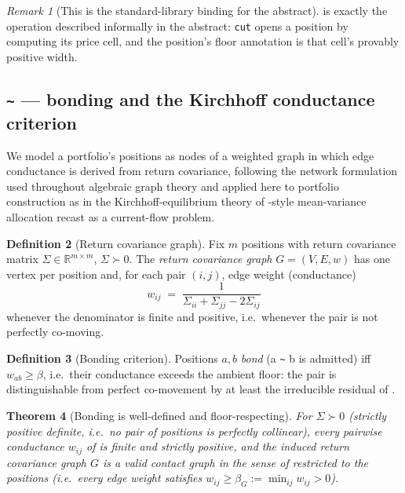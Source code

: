 \documentclass[11pt,a4paper]{article}
\theoremstyle{thmstyle}
\newtheorem{theorem}{Theorem}[section]
\theoremstyle{definition}
\newtheorem{definition}[theorem]{Definition}
\theoremstyle{remark}
\newtheorem{remark}[theorem]{Remark}
\newcommand{\R}{\mathbb{R}}
\newcommand{\V}{V}
\newcommand{\E}{E}
\newcommand{\wt}{w}
\newcommand{\flo}{\beta}
\newcommand{\sh}[1]{\texttt{#1}}
\begin{document}
\begin{remark}[This is the standard-library binding for the abstract]
\label{rem:bind-position}
 is exactly the operation described informally in
the abstract: \sh{cut} opens a position by computing its price cell, and
the position's floor annotation is that cell's provably positive width.
\end{remark}

\subsection{\texorpdfstring{\sh{\~{}} --- bonding and the Kirchhoff conductance criterion}{~ --- bonding}}
\label{sec:stdlib-bond}

We model a portfolio's positions as nodes of a weighted graph in which
edge conductance is derived from return covariance, following the
network formulation used throughout algebraic graph theory
\citep{godsilroyle2001,fiedler1973} and applied here to portfolio
construction as in the Kirchhoff-equilibrium theory of
\citet{markowitz1952}-style mean-variance allocation recast as a
current-flow problem.

\begin{definition}[Return covariance graph]
\label{def:covgraph}
Fix $m$ positions with return covariance matrix
$\Sigma\in\R^{m\times m}$, $\Sigma\succ0$. The \emph{return covariance
graph} $G=(\V,\E,\wt)$ has one vertex per position and, for each pair
$(i,j)$, edge weight (conductance)
\[
\wt_{ij} \;=\; \frac{1}{\Sigma_{ii}+\Sigma_{jj}-2\Sigma_{ij}}
\]
whenever the denominator is finite and positive, i.e.\ whenever the pair
is not perfectly co-moving.
\end{definition}

\begin{definition}[Bonding criterion]
\label{def:bond-criterion}
Positions $a,b$ \emph{bond} (a \sh{\~{}} b is admitted) iff
$\wt_{ab}\ge\flo$, i.e.\ their conductance exceeds the ambient floor: the
pair is distinguishable from perfect co-movement by at least the
irreducible residual of .
\end{definition}

\begin{theorem}[Bonding is well-defined and floor-respecting]
\label{thm:bond-welldefined}
For $\Sigma\succ0$ (strictly positive definite, i.e.\ no pair of
positions is perfectly collinear), every pairwise conductance
$\wt_{ij}$ of  is finite and strictly positive, and
the induced return covariance graph $G$ is a valid contact graph in the
sense of  restricted to the positions (i.e.\
every edge weight satisfies $\wt_{ij}\ge\flo_G:=\min_{ij}\wt_{ij}>0$).
\end{theorem}
\end{document}

